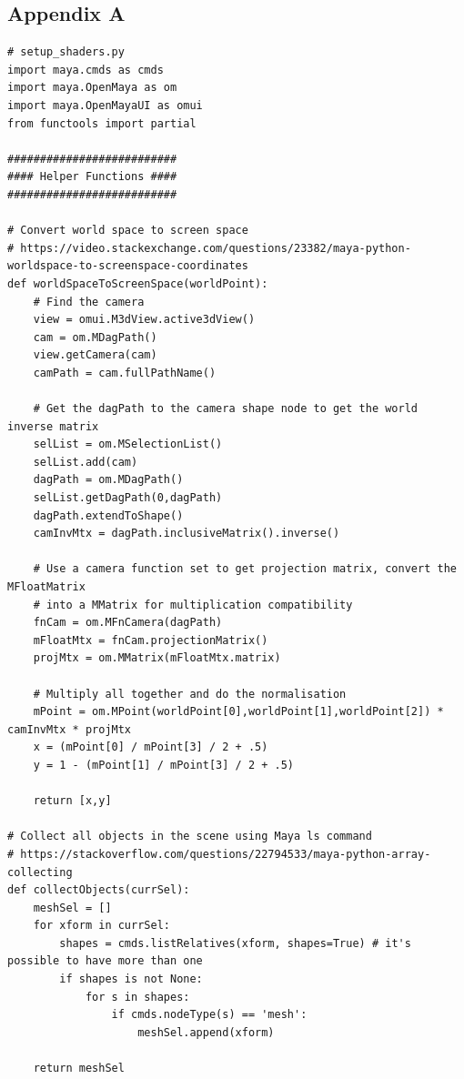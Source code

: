\documentclass[conference]{IEEEtran}
\begin{document}
\pagebreak

\begin{center}
\section*{Appendix A}
\label{app:a}
\end{center}

\footnotesize{
\begin{verbatim}
# setup_shaders.py
import maya.cmds as cmds
import maya.OpenMaya as om
import maya.OpenMayaUI as omui
from functools import partial

##########################
#### Helper Functions ####
##########################

# Convert world space to screen space
# https://video.stackexchange.com/questions/23382/maya-python-worldspace-to-screenspace-coordinates
def worldSpaceToScreenSpace(worldPoint):
    # Find the camera
    view = omui.M3dView.active3dView()
    cam = om.MDagPath()
    view.getCamera(cam)
    camPath = cam.fullPathName()
    
    # Get the dagPath to the camera shape node to get the world inverse matrix
    selList = om.MSelectionList()
    selList.add(cam)
    dagPath = om.MDagPath()
    selList.getDagPath(0,dagPath)
    dagPath.extendToShape()
    camInvMtx = dagPath.inclusiveMatrix().inverse()

    # Use a camera function set to get projection matrix, convert the MFloatMatrix 
    # into a MMatrix for multiplication compatibility
    fnCam = om.MFnCamera(dagPath)
    mFloatMtx = fnCam.projectionMatrix()
    projMtx = om.MMatrix(mFloatMtx.matrix)

    # Multiply all together and do the normalisation
    mPoint = om.MPoint(worldPoint[0],worldPoint[1],worldPoint[2]) * camInvMtx * projMtx
    x = (mPoint[0] / mPoint[3] / 2 + .5)
    y = 1 - (mPoint[1] / mPoint[3] / 2 + .5)
    
    return [x,y]

# Collect all objects in the scene using Maya ls command
# https://stackoverflow.com/questions/22794533/maya-python-array-collecting
def collectObjects(currSel):
    meshSel = []
    for xform in currSel:
        shapes = cmds.listRelatives(xform, shapes=True) # it's possible to have more than one
        if shapes is not None:
            for s in shapes:
                if cmds.nodeType(s) == 'mesh':
                    meshSel.append(xform)
  
    return meshSel
    

\end{verbatim}}
\end{document}
